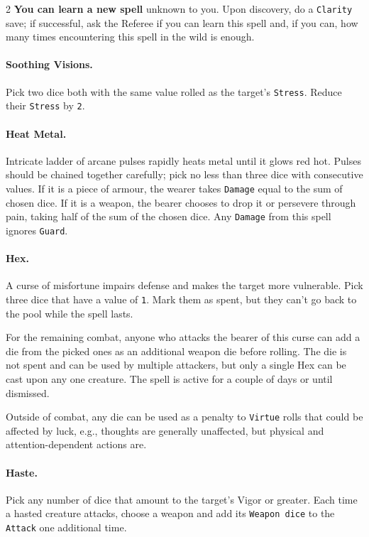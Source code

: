 \begin{multicols*}{2}
\textbf{You can learn a new spell} unknown to you. 
Upon discovery, do a \texttt{Clarity} save; if successful, ask the Referee if you can learn this spell and, if you can, how many times encountering this spell in the wild is enough.

\paragraph{Soothing Visions. } Pick two dice both with the same value rolled as the target's \texttt{Stress}. 
Reduce their \texttt{Stress} by \texttt{2}.

\paragraph{Heat Metal.} Intricate ladder of arcane pulses rapidly heats metal until it glows red hot.
Pulses should be chained together carefully; pick no less than three dice with consecutive values.
If it is a piece of armour, the wearer takes \texttt{Damage} equal to the sum of chosen dice.
If it is a weapon, the bearer chooses to drop it or persevere through pain, taking half of the sum of the chosen dice.
Any \texttt{Damage} from this spell ignores \texttt{Guard}.


\paragraph{Hex.}
A curse of misfortune impairs defense and makes the target more vulnerable.
Pick three dice that have a value of \texttt{1}. Mark them as spent, but they can't go back to the pool while the spell lasts.

For the remaining combat, anyone who attacks the bearer of this curse can add a die from the picked ones as an additional weapon die before rolling.
The die is not spent and can be used by multiple attackers, but only a single Hex can be cast upon any one creature.
The spell is active for a couple of days or until dismissed. 

Outside of combat, any die can be used as a penalty to \texttt{Virtue} rolls that could be affected by luck, e.g., thoughts are generally unaffected, but physical and attention-dependent actions are.

\paragraph{Haste.} Pick any number of dice that amount to the target's Vigor or greater.
Each time a hasted creature attacks, choose a weapon and add its \texttt{Weapon dice} to the \texttt{Attack} one additional time.


\end{multicols*}
